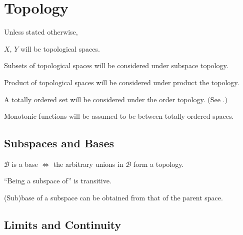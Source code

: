 \chapter{Topology}

\begin{conv}
	Unless stated otherwise,
	\begin{assmplist}
		\item $X$, $Y$ will be topological spaces.
		
		\item Subsets of topological spaces will be considered under subspace topology.
		
		\item Product of topological spaces will be considered under product the topology.
		
		\item A totally ordered set will be considered under the order topology. (See .)
		
		\item Monotonic functions will be assumed to be between totally ordered spaces.
	\end{assmplist}
\end{conv}



\section{Subspaces and Bases}

	\begin{lem}
		$\mathscr B$ is a base $\iff$ the arbitrary unions in $\mathscr B$ form a topology.
	\end{lem}
	
	\begin{lem}\label{LEM: subspaces and bases}
		\leavevmode
		\begin{mylist}
			\item ``Being a subspace of'' is transitive.
			
			\item\label{LEMii: subspaces and bases} (Sub)base of a subspace can be obtained from that of the parent space.
		\end{mylist}
	\end{lem}
	



\section{Limits and Continuity}

